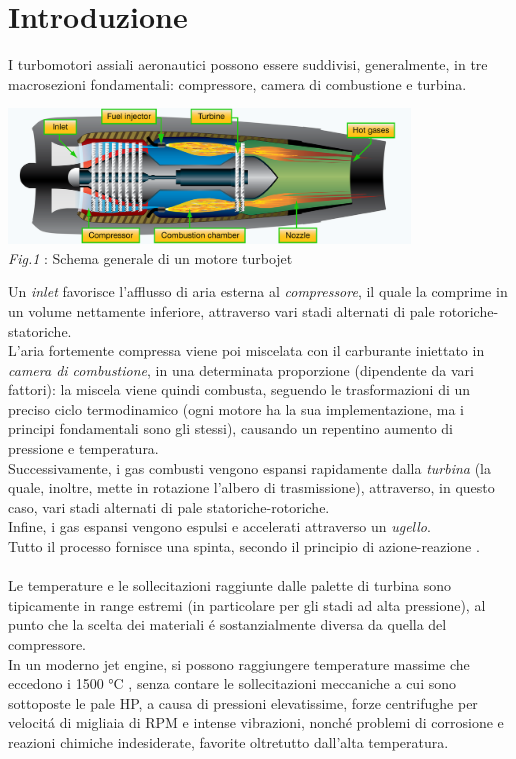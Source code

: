 \documentclass{article}
\begin{document}
    \section{Introduzione}
    I turbomotori assiali aeronautici possono essere suddivisi, generalmente, in tre macrosezioni
    fondamentali: compressore, camera di combustione e turbina.\\
    \begin{center}
        \includegraphics[width=0.8\textwidth]{Sources/turbojet.png}\\
        \textit{Fig.1 }: Schema generale di un motore turbojet \autocite*{turbojet} 
    \end{center}
    Un \textit{inlet} favorisce l'afflusso di aria esterna al \textit{compressore}, il quale
    la comprime in un volume nettamente inferiore, attraverso vari stadi alternati di pale rotoriche-statoriche.\\
    L'aria fortemente compressa viene poi miscelata con il carburante iniettato in \textit{camera di combustione},
    in una determinata proporzione (dipendente da vari fattori): la miscela viene quindi combusta, seguendo le trasformazioni di
    un preciso ciclo termodinamico (ogni motore ha la sua implementazione, ma i principi fondamentali sono gli stessi), causando un repentino
    aumento di pressione e temperatura.\\
    Successivamente, i gas combusti vengono espansi rapidamente dalla \textit{turbina} (la quale, inoltre, mette in rotazione l'albero di trasmissione), attraverso, in questo caso,
    vari stadi alternati di pale statoriche-rotoriche.\\
    Infine, i gas espansi vengono espulsi e accelerati attraverso un \textit{ugello}.\\
    Tutto il processo fornisce una spinta, secondo il principio di azione-reazione \autocite*{Aircr_engine_design}.\\ \\
    Le temperature e le sollecitazioni raggiunte dalle palette di turbina sono tipicamente in range estremi (in particolare per gli stadi ad alta pressione),
    al punto che la scelta dei materiali é sostanzialmente diversa da quella del compressore.\\
    In un moderno jet engine, si possono raggiungere temperature massime che eccedono i 1500 °C \autocite*{SciencePubGroup}, 
    senza contare le sollecitazioni meccaniche a cui sono sottoposte le pale HP, a causa di pressioni elevatissime,
    forze centrifughe per velocitá di migliaia di RPM e intense vibrazioni, nonché problemi di corrosione
    e reazioni chimiche indesiderate, favorite oltretutto dall'alta temperatura.\\
    
\end{document}
